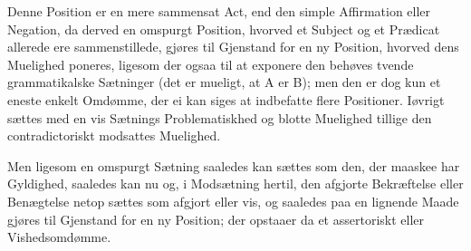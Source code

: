 \documentclass[12pt]{book}
\def\sperr#1{#1}%
\def\textit#1{#1}%
\def\emph#1{#1}%
\newcommand{\sperr}[1]{\textls[180]{#1}}
\newcommand{\opage}[1]{\marginnote{\footnotesize\textit{[#1]}}}
\begin{document}
Denne Position er en mere sammensat Act, end den simple Affirmation eller Negation, da
derved en omspurgt Position, hvorved et Subject og et Prædicat allerede ere
sammenstillede, gjøres til Gjenstand for en ny Position, hvorved
\opage{282} dens Muelighed poneres, ligesom der ogsaa til at exponere den behøves tvende
grammatikalske Sætninger (det er mueligt, at \textit{A} er \textit{B}); men den er dog kun
et eneste enkelt Omdømme, der ei kan siges at indbefatte flere Positioner. Iøvrigt sættes
med en vis Sætnings Problematiskhed og blotte Muelighed tillige den contradictoriskt
modsattes Muelighed.

Men ligesom en omspurgt Sætning saaledes kan sættes som den, der maaskee har Gyldighed,
saaledes kan nu og, i Modsætning hertil, den afgjorte Bekræftelse eller Benægtelse netop
sættes som afgjort eller vis, og saaledes paa en lignende Maade gjøres til Gjenstand for en
ny Position; der opstaaer da et \emph{assertoriskt} eller \emph{Vishedsomdømme}.
\end{document}
